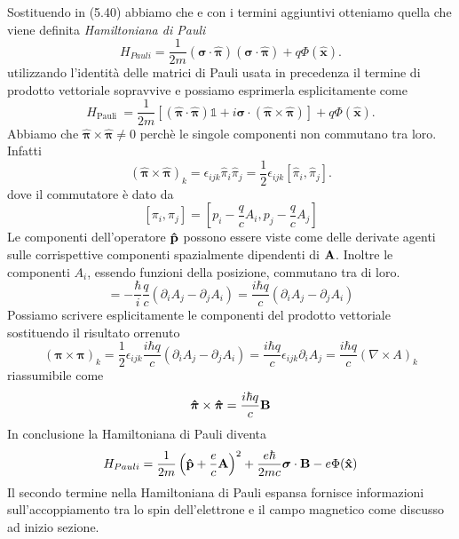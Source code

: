Sostituendo in (5.40) abbiamo che e con i termini aggiuntivi otteniamo quella che viene definita \textit{Hamiltoniana di Pauli}
\begin{equation}
	H_{Pauli} = \frac{1}{2m}(\boldsymbol{\sigma} \cdot \hat{\boldsymbol{\pi}})(\boldsymbol{\sigma} \cdot \hat{\boldsymbol{\pi}})+q \Phi(\hat{\mathbf{x}}) .
\end{equation}
utilizzando l'identit\`a delle matrici di Pauli usata in precedenza il termine di prodotto vettoriale sopravvive e possiamo esprimerla esplicitamente come
\begin{equation*}
H_{\text {Pauli }}=\frac{1}{2 m}[(\hat{\boldsymbol{\pi}} \cdot \hat{\boldsymbol{\pi}}) \mathbb{1}+i \boldsymbol{\sigma} \cdot(\hat{\boldsymbol{\pi}} \times \hat{\boldsymbol{\pi}})]+q \Phi(\hat{\mathbf{x}}) .
\end{equation*}
Abbiamo che $\boldsymbol{\hat{\pi}}\times \boldsymbol{\hat{\pi}} \neq 0$ perch\`e le singole componenti non commutano tra loro. Infatti
\begin{equation*}
	(\hat{\boldsymbol{\pi}} \times \hat{\boldsymbol{\pi}})_k=\epsilon_{i j k} \hat{\pi}_i \hat{\pi}_j=\frac{1}{2} \epsilon_{i j k}\left[\hat{\pi}_i, \hat{\pi}_j\right] .
\end{equation*}
dove il commutatore \`e dato da
\begin{equation*}
	\left[\pi_i, \pi_j\right]=\left[p_i-\frac{q}{c} A_i, p_j-\frac{q}{c} A_j\right] 
\end{equation*}
Le componenti dell'operatore $\bold{\hat{p}}$ possono essere viste come delle derivate agenti sulle corrispettive componenti spazialmente dipendenti di $\bold{A}$. Inoltre le componenti $A_i$, essendo funzioni della posizione, commutano tra di loro.
\begin{equation*}
	[\pi_i , \pi_j] = - \frac{\hbar}{i}\frac{q}{c}(\partial_i A_j - \partial_j A_i) = \frac{i \hbar q}{c}(\partial_i A_j - \partial_j A_i)
\end{equation*}
Possiamo scrivere esplicitamente le componenti del prodotto vettoriale sostituendo il risultato orrenuto 
\begin{equation*}
	(\boldsymbol{\pi} \times \boldsymbol{\pi})_k=\frac{1}{2} \epsilon_{i j k} \frac{i \hbar q}{c}\left(\partial_i A_j-\partial_j A_i\right)=\frac{i \hbar q}{c} \epsilon_{i j k} \partial_i A_j=\frac{i \hbar q}{c}(\nabla \times A)_k
\end{equation*}
riassumibile come 
\begin{equation*}
	\boldsymbol{\hat{\pi}} \times \boldsymbol{\hat{\pi}} = \frac{i \hbar q}{c} \bold{B}
\end{equation*}
In conclusione la Hamiltoniana di Pauli diventa
\begin{equation*}
	H_{Pauli} = \frac{1}{2m} \left( \bold{\hat{p}} + \frac{e}{c} \bold{A} \right)^2 + \frac{e \hbar }{2mc} \boldsymbol{\sigma} \cdot \bold{B} - e \Phi(\bold{\hat{x}})
\end{equation*}
Il secondo termine nella Hamiltoniana di Pauli espansa fornisce informazioni sull'accoppiamento tra lo spin dell'elettrone e il campo magnetico come discusso ad inizio sezione.

